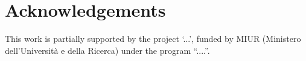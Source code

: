 \section*{Acknowledgements}
This work is partially supported by the project \enquote*{...}, funded by MIUR (Ministero dell{'}Universit{\`{a}} e della Ricerca) under the program \enquote{....}.
